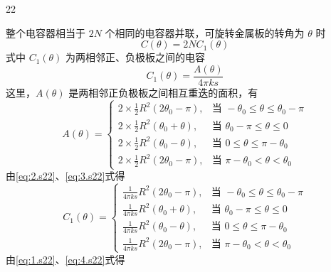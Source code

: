 \begin{solution}{22}
    \begin{subsolution}
        整个电容器相当于 $2N$ 个相同的电容器并联，可旋转金属板的转角为 $\theta$ 时
        \begin{equation}
            C(\theta) = 2N C_1(\theta)
            \label{eq:1.s22}
        \end{equation}
        式中 $C_1(\theta)$ 为两相邻正、负极板之间的电容
        \begin{equation}
            C_1(\theta) = \frac{A(\theta)}{4\pi k s}
            \label{eq:2.s22}
        \end{equation}
        这里，$A(\theta)$ 是两相邻正负极板之间相互重迭的面积，有
        \begin{equation}
            A(\theta) = \begin{cases}
                2 \times \frac{1}{2}R^2(2\theta_0 - \pi), & \text{当 } -\theta_0 \leq \theta \leq \theta_0 - \pi \\
                2 \times \frac{1}{2}R^2(\theta_0 + \theta), & \text{当 } \theta_0 - \pi \leq \theta \leq 0 \\
                2 \times \frac{1}{2}R^2(\theta_0 - \theta), & \text{当 } 0 \leq \theta \leq \pi - \theta_0 \\
                2 \times \frac{1}{2}R^2(2\theta_0 - \pi), & \text{当 } \pi - \theta_0 < \theta < \theta_0
            \end{cases}
            \label{eq:3.s22}
        \end{equation}
        由\eqref{eq:2.s22}、\eqref{eq:3.s22}式得
        \begin{equation}
            C_1(\theta) = \begin{cases}
                \frac{1}{4\pi k s}R^2(2\theta_0 - \pi), & \text{当 } -\theta_0 \leq \theta \leq \theta_0 - \pi \\
                \frac{1}{4\pi k s}R^2(\theta_0 + \theta), & \text{当 } \theta_0 - \pi \leq \theta \leq 0 \\
                \frac{1}{4\pi k s}R^2(\theta_0 - \theta), & \text{当 } 0 \leq \theta \leq \pi - \theta_0 \\
                \frac{1}{4\pi k s}R^2(2\theta_0 - \pi), & \text{当 } \pi - \theta_0 < \theta < \theta_0
            \end{cases}
            \label{eq:4.s22}
        \end{equation}
        由\eqref{eq:1.s22}、\eqref{eq:4.s22}式得
        \begin{equation}

\end{equation}
\end{subsolution}
\end{solution}

